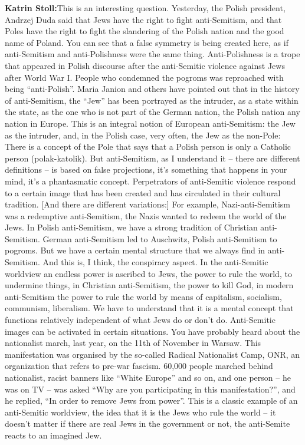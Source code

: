 \textbf{Katrin Stoll:}This is an interesting question. Yesterday, the Polish president, Andrzej Duda said that Jews have the right to fight anti-Semitism, and that Poles have the right to fight the slandering of the Polish nation and the good name of Poland. You can see that a false symmetry is being created here, as if anti-Semitism and anti-Polishness were the same thing. Anti-Polishness is a trope that appeared in Polish discourse after the anti-Semitic violence against Jews after World War I. People who condemned the pogroms was reproached with being "`anti-Polish"'. Maria Janion and others have pointed out that in the history of anti-Semitism, the "`Jew"' has been portrayed as the intruder, as a state within the state, as the one who is not part of the German nation, the Polish nation any nation in Europe. This is an integral notion of European anti-Semitism: the Jew as the intruder, and, in the Polish case, very often, the Jew as the non-Pole: There is a concept of the Pole that says that a Polish person is only a Catholic person (polak-katolik). But anti-Semitism, as I understand it – there are different definitions – is based on false projections, it’s something that happens in your mind, it’s a phantasmatic concept. Perpetrators of anti-Semitic violence respond to a certain image that has been created and has circulated in their cultural tradition. [And there are different variations:] For example, Nazi-anti-Semitism was a redemptive anti-Semitism, the Nazis wanted to redeem the world of the Jews. In Polish anti-Semitism, we have a strong tradition of Christian anti-Semitism. German anti-Semitism led to Auschwitz, Polish anti-Semitism to pogroms. But we have a certain mental structure that we always find in anti-Semitism. And this is, I think, the conspiracy aspect. In the anti-Semitic worldview an endless power is ascribed to Jews, the power to rule the world, to undermine things, in Christian anti-Semitism, the power to kill God, in modern anti-Semitism the power to rule the world by means of capitalism, socialism, communism, liberalism. We have to understand that it is a mental concept that functions relatively independent of what Jews do or don’t do. Anti-Semitic images can be activated in certain situations. You have probably heard about the nationalist march, last year, on the 11th of November in Warsaw. This manifestation was organised by the so-called Radical Nationalist Camp, ONR, an organization that refers to pre-war fascism. 60,000 people marched behind nationalist, racist banners like "`White Europe"' and so on, and one person – he was on TV – was asked "`Why are you participating in this manifestation?"', and he replied, "`In order to remove Jews from power"'. This is a classic example of an anti-Semitic worldview, the idea that it is the Jews who rule the world – it doesn’t matter if there are real Jews in the government or not, the anti-Semite reacts to an imagined Jew.\\
